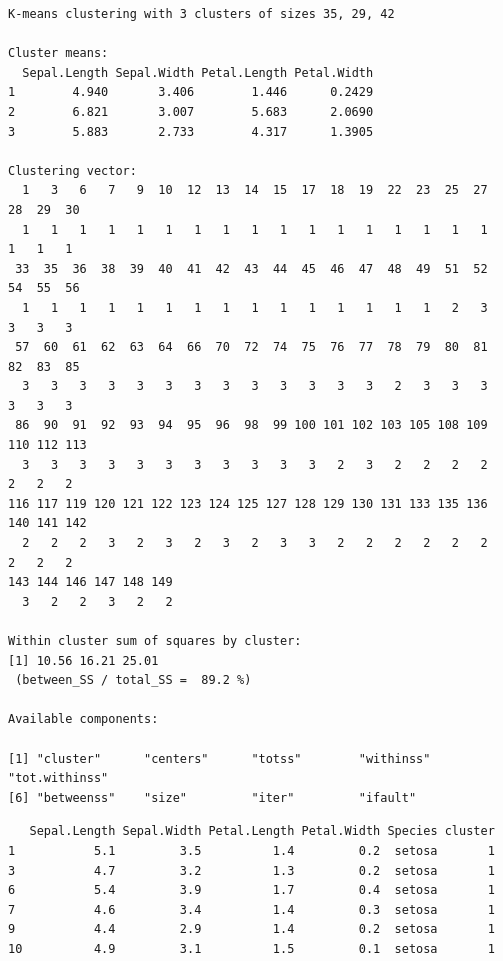 \documentclass[12pt,brazil,oneside]{book}
\newenvironment{Shaded}{\begin{snugshade}}{\end{snugshade}}
\newcommand{\DataTypeTok}[1]{\textcolor[rgb]{0.13,0.29,0.53}{#1}}
\newcommand{\KeywordTok}[1]{\textcolor[rgb]{0.13,0.29,0.53}{\textbf{#1}}}
\newcommand{\NormalTok}[1]{#1}
\newcommand{\OperatorTok}[1]{\textcolor[rgb]{0.81,0.36,0.00}{\textbf{#1}}}
\begin{document}
\begin{verbatim}
K-means clustering with 3 clusters of sizes 35, 29, 42

Cluster means:
  Sepal.Length Sepal.Width Petal.Length Petal.Width
1        4.940       3.406        1.446      0.2429
2        6.821       3.007        5.683      2.0690
3        5.883       2.733        4.317      1.3905

Clustering vector:
  1   3   6   7   9  10  12  13  14  15  17  18  19  22  23  25  27  28  29  30 
  1   1   1   1   1   1   1   1   1   1   1   1   1   1   1   1   1   1   1   1 
 33  35  36  38  39  40  41  42  43  44  45  46  47  48  49  51  52  54  55  56 
  1   1   1   1   1   1   1   1   1   1   1   1   1   1   1   2   3   3   3   3 
 57  60  61  62  63  64  66  70  72  74  75  76  77  78  79  80  81  82  83  85 
  3   3   3   3   3   3   3   3   3   3   3   3   3   2   3   3   3   3   3   3 
 86  90  91  92  93  94  95  96  98  99 100 101 102 103 105 108 109 110 112 113 
  3   3   3   3   3   3   3   3   3   3   3   2   3   2   2   2   2   2   2   2 
116 117 119 120 121 122 123 124 125 127 128 129 130 131 133 135 136 140 141 142 
  2   2   2   3   2   3   2   3   2   3   3   2   2   2   2   2   2   2   2   2 
143 144 146 147 148 149 
  3   2   2   3   2   2 

Within cluster sum of squares by cluster:
[1] 10.56 16.21 25.01
 (between_SS / total_SS =  89.2 %)

Available components:

[1] "cluster"      "centers"      "totss"        "withinss"     "tot.withinss"
[6] "betweenss"    "size"         "iter"         "ifault"      
\end{verbatim}

\begin{Shaded}
\end{Shaded}

\begin{verbatim}
   Sepal.Length Sepal.Width Petal.Length Petal.Width Species cluster
1           5.1         3.5          1.4         0.2  setosa       1
3           4.7         3.2          1.3         0.2  setosa       1
6           5.4         3.9          1.7         0.4  setosa       1
7           4.6         3.4          1.4         0.3  setosa       1
9           4.4         2.9          1.4         0.2  setosa       1
10          4.9         3.1          1.5         0.1  setosa       1
\end{verbatim}
\end{document}
